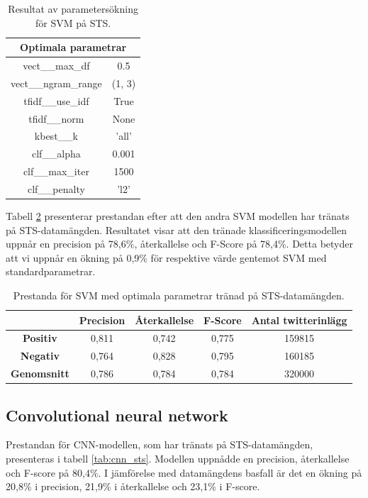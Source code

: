\documentclass{kaumasters} %
\begin{document}
\begin{table}[H]
\centering
\caption{Resultat av parametersökning för SVM på STS.}
\label{tab:svm_grid_sts}
    \begin{tabular}{cc}
    \toprule
    \multicolumn{2}{c}{\textbf{Optimala parametrar}} \\
    \midrule
    vect\_\_max\_df & 0.5  \\
    vect\_\_ngram\_range & (1, 3)  \\
    tfidf\_\_use\_idf & True  \\
    tfidf\_\_norm & None  \\
    kbest\_\_k & 'all' \\
    clf\_\_alpha & 0.001 \\
    clf\_\_max\_iter & 1500 \\
    clf\_\_penalty & 'l2' \\
    \bottomrule
\end{tabular}
\end{table}

Tabell \ref{tab:svm_imp_sts} presenterar prestandan efter att den andra SVM modellen har tränats på STS-datamängden. Resultatet visar att den tränade klassificeringsmodellen uppnår en precision på 78,6\%, återkallelse och F-Score på 78,4\%. Detta betyder att vi uppnår en ökning på 0,9\% för respektive värde gentemot SVM med standardparametrar. 

\begin{table}[H]
\centering
\caption{Prestanda för SVM med optimala parametrar tränad på STS-datamängden.}
\label{tab:svm_imp_sts}
    \begin{tabular}{ccccc}
    \toprule
     & \textbf{Precision} & \textbf{Återkallelse} & \textbf{F-Score} & \textbf{Antal twitterinlägg}  \\
    \midrule
    \textbf{Positiv} & 0,811 & 0,742 & 0,775 & 159815 \\
    \textbf{Negativ} & 0,764 & 0,828 & 0,795 & 160185 \\
    \midrule
    \textbf{Genomsnitt} & 0,786 & 0,784 & 0,784  & 320000 \\
    \bottomrule
\end{tabular}
\end{table}


\subsection{Convolutional neural network}
Prestandan för CNN-modellen, som har tränats på STS-datamängden, presenteras i tabell \ref{tab:cnn_sts}. Modellen uppnådde en precision, återkallelse och F-score på 80,4\%. I jämförelse med datamängdens basfall är det en ökning på 20,8\% i precision, 21,9\% i återkallelse och 23,1\% i F-score.
\end{document}
